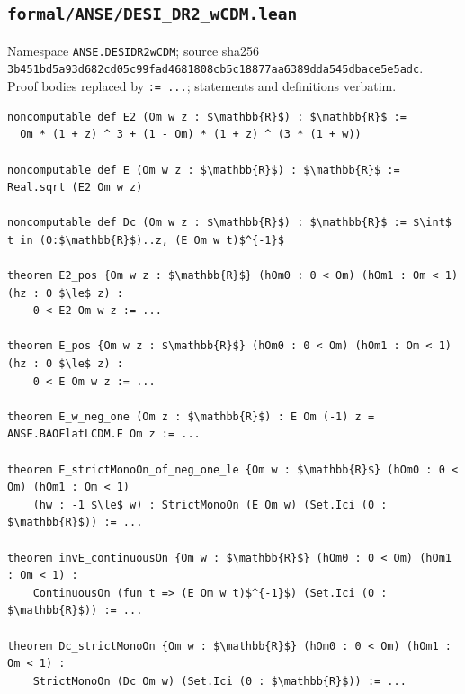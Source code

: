 \subsection*{\texttt{formal/ANSE/DESI\_DR2\_wCDM.lean}}
Namespace \texttt{ANSE.DESIDR2wCDM}; source sha256\\ {\scriptsize\texttt{3b451bd5a93d682cd05c99fad4681808cb5c18877aa6389dda545dbace5e5adc}}.\\ Proof bodies replaced by \texttt{:= ...}; statements and definitions verbatim.
\begin{lstlisting}[mathescape]
noncomputable def E2 (Om w z : $\mathbb{R}$) : $\mathbb{R}$ :=
  Om * (1 + z) ^ 3 + (1 - Om) * (1 + z) ^ (3 * (1 + w))

noncomputable def E (Om w z : $\mathbb{R}$) : $\mathbb{R}$ := Real.sqrt (E2 Om w z)

noncomputable def Dc (Om w z : $\mathbb{R}$) : $\mathbb{R}$ := $\int$ t in (0:$\mathbb{R}$)..z, (E Om w t)$^{-1}$

theorem E2_pos {Om w z : $\mathbb{R}$} (hOm0 : 0 < Om) (hOm1 : Om < 1) (hz : 0 $\le$ z) :
    0 < E2 Om w z := ...

theorem E_pos {Om w z : $\mathbb{R}$} (hOm0 : 0 < Om) (hOm1 : Om < 1) (hz : 0 $\le$ z) :
    0 < E Om w z := ...

theorem E_w_neg_one (Om z : $\mathbb{R}$) : E Om (-1) z = ANSE.BAOFlatLCDM.E Om z := ...

theorem E_strictMonoOn_of_neg_one_le {Om w : $\mathbb{R}$} (hOm0 : 0 < Om) (hOm1 : Om < 1)
    (hw : -1 $\le$ w) : StrictMonoOn (E Om w) (Set.Ici (0 : $\mathbb{R}$)) := ...

theorem invE_continuousOn {Om w : $\mathbb{R}$} (hOm0 : 0 < Om) (hOm1 : Om < 1) :
    ContinuousOn (fun t => (E Om w t)$^{-1}$) (Set.Ici (0 : $\mathbb{R}$)) := ...

theorem Dc_strictMonoOn {Om w : $\mathbb{R}$} (hOm0 : 0 < Om) (hOm1 : Om < 1) :
    StrictMonoOn (Dc Om w) (Set.Ici (0 : $\mathbb{R}$)) := ...
\end{lstlisting}

